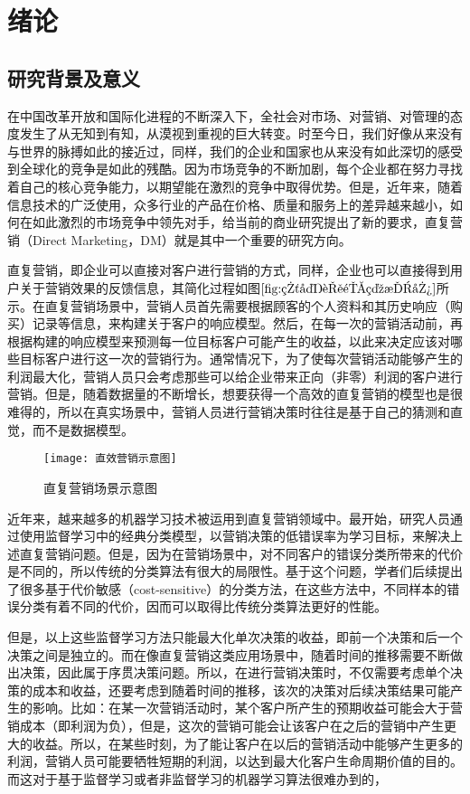 \chapter{绪论}

 \section{研究背景及意义}
 在中国改革开放和国际化进程的不断深入下，全社会对市场、对营销、对管理的态度发生了从无知到有知，从漠视到重视的巨大转变。时至今日，我们好像从来没有与世界的脉搏如此的接近过，同样，我们的企业和国家也从来没有如此深切的感受到全球化的竞争是如此的残酷。因为市场竞争的不断加剧，每个企业都在努力寻找着自己的核心竞争能力，以期望能在激烈的竞争中取得优势。但是，近年来，随着信息技术的广泛使用，众多行业的产品在价格、质量和服务上的差异越来越小，如何在如此激烈的市场竞争中领先对手，给当前的商业研究提出了新的要求，直复营销（Direct Marketing，DM）就是其中一个重要的研究方向。

 直复营销，即企业可以直接对客户进行营销的方式\citep{王广宇2013客户关系管理}，同样，企业也可以直接得到用户关于营销效果的反馈信息，其简化过程如图$\ref{fig:直复营销示意图}$所示。在直复营销场景中，营销人员首先需要根据顾客的个人资料和其历史响应（购买）记录等信息，来构建关于客户的响应模型。然后，在每一次的营销活动前，再根据构建的响应模型来预测每一位目标客户可能产生的收益，以此来决定应该对哪些目标客户进行这一次的营销行为。通常情况下，为了使每次营销活动能够产生的利润最大化，营销人员只会考虑那些可以给企业带来正向（非零）利润的客户进行营销。但是，随着数据量的不断增长，想要获得一个高效的直复营销的模型也是很难得的，所以在真实场景中，营销人员进行营销决策时往往是基于自己的猜测和直觉，而不是数据模型\citep{tkachenko2015autonomous}。
	\begin{figure}[htbp]
	\centering
	\texttt{[image: 直效营销示意图]}
	\caption{直复营销场景示意图}
	\label{fig:直复营销示意图}
	\end{figure}

近年来，越来越多的机器学习技术被运用到直复营销领域中。最开始，研究人员通过使用监督学习中的经典分类模型，以营销决策的低错误率为学习目标，来解决上述直复营销问题。但是，因为在营销场景中，对不同客户的错误分类所带来的代价是不同的，所以传统的分类算法有很大的局限性。基于这个问题，学者们后续提出了很多基于代价敏感（cost-sensitive）的分类方法，在这些方法中，不同样本的错误分类有着不同的代价，因而可以取得比传统分类算法更好的性能。

但是，以上这些监督学习方法只能最大化单次决策的收益，即前一个决策和后一个决策之间是独立的。而在像直复营销这类应用场景中，随着时间的推移需要不断做出决策，因此属于序贯决策问题。所以，在进行营销决策时，不仅需要考虑单个决策的成本和收益，还要考虑到随着时间的推移，该次的决策对后续决策结果可能产生的影响。比如：在某一次营销活动时，某个客户所产生的预期收益可能会大于营销成本（即利润为负），但是，这次的营销可能会让该客户在之后的营销中产生更大的收益。所以，在某些时刻，为了能让客户在以后的营销活动中能够产生更多的利润，营销人员可能要牺牲短期的利润，以达到最大化客户生命周期价值的目的。而这对于基于监督学习或者非监督学习的机器学习算法很难办到的，

